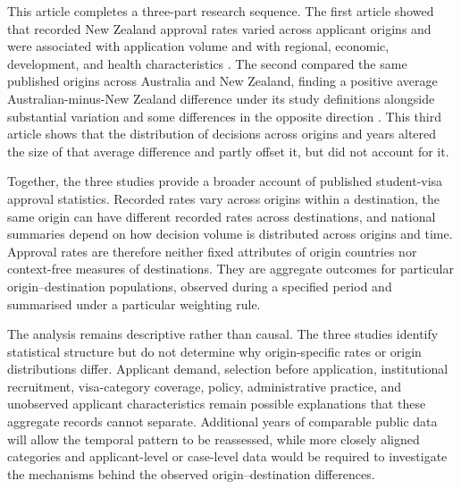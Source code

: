 \documentclass[runningheads]{llncs}
\begin{document}
This article completes a three-part research sequence. The first article showed that recorded New Zealand approval rates varied across applicant origins and were associated with application volume and with regional, economic, development, and health characteristics \cite{Kaplan2026NZVisaApproval}. The second compared the same published origins across Australia and New Zealand, finding a positive average Australian-minus-New Zealand difference under its study definitions alongside substantial variation and some differences in the opposite direction \cite{Kaplan2026AUNZDecisionOutcomes}. This third article shows that the distribution of decisions across origins and years altered the size of that average difference and partly offset it, but did not account for it.

Together, the three studies provide a broader account of published student-visa approval statistics. Recorded rates vary across origins within a destination, the same origin can have different recorded rates across destinations, and national summaries depend on how decision volume is distributed across origins and time. Approval rates are therefore neither fixed attributes of origin countries nor context-free measures of destinations. They are aggregate outcomes for particular origin--destination populations, observed during a specified period and summarised under a particular weighting rule.

The analysis remains descriptive rather than causal. The three studies identify statistical structure but do not determine why origin-specific rates or origin distributions differ. Applicant demand, selection before application, institutional recruitment, visa-category coverage, policy, administrative practice, and unobserved applicant characteristics remain possible explanations that these aggregate records cannot separate. Additional years of comparable public data will allow the temporal pattern to be reassessed, while more closely aligned categories and applicant-level or case-level data would be required to investigate the mechanisms behind the observed origin--destination differences.



\end{document}
